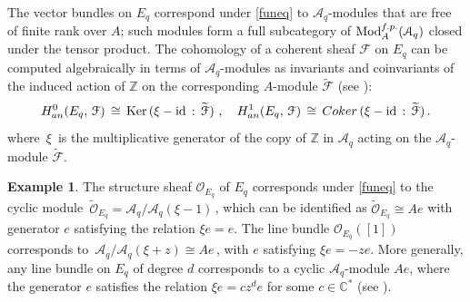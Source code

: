 \documentclass[11pt]{amsart}
\theoremstyle{definition}
\newtheorem{example}[theorem]{Example}
\theoremstyle{remark}
\numberwithin{equation}{section}
\newcommand{\la}{\label}
\newcommand{\Ker}{\mathrm{Ker}}
\newcommand{\id}{\mathrm{id}}
\def\c{\mathbb{C}}
\def\A{\mathcal{A}}
\def\Z{\mathbb{Z}}
\def\O{\mathcal{O}}
\def\Mod{\mathrm{Mod}}
\def \cF{\mathcal{F}}
\begin{document}
The vector bundles on $E_q$ correspond under \eqref{funeq} to $\A_q$-modules that are free of finite rank over $ A$; such modules form a full subcategory of $ \Mod^{\rm f.p.}_{A}(\A_q) $ closed under the tensor product. The cohomology of a coherent sheaf $\cF$ on $E_q$ can be computed algebraically in terms of $\A_q$-modules as invariants and coinvariants of the induced action of $ \Z $ on the corresponding $A$-module $\widetilde{\cF}$ (see \cite[Lemma 2.1]{vdPR07}):
%
\begin{equation}\la{H01}
H^0_{\rm an}(E_q,\,\cF) \,\cong\, \Ker\,(\xi- \id\,:\,\widetilde{\cF})
\ ,\quad  
H^1_{\rm an}(E_q,\,\cF) \,\cong\, {\rm Coker}\,(\xi- \id\,:\,\widetilde{\cF})
\,.
\end{equation}
%
where $\, \xi \,$ is the multiplicative generator of the copy of $\Z $ in $ \A_q$ acting on the $\A_q$-module $\widetilde{\cF}$. 

\begin{example}\la{Ex222}
The structure sheaf $ \O_{E_q}$ of $E_q$ corresponds under \eqref{funeq} to the cyclic module
$\,\widetilde{\O}_{E_q} = \A_q/\A_q(\xi-1)\,$, which can be identified as $ \widetilde{\O}_{E_q} \cong A e $
with generator $e$ satisfying the relation $ \xi e = e $. The line bundle $ \O_{E_{q}}([1])$ corresponds to $\, \A_q/\A_q(\xi+z) \cong A e\,$, with $e$ satisfying $ \xi e = - z e$. 
More generally, any line bundle on $E_q$ of degree $d$
corresponds to a cyclic $\A_q$-module $ A e $, where the generator $e$ satisfies the relation
$ \xi e = c z^d e $ for some $ c\in \c^* $ (see \cite[Example 2.2]{vdPR07}). 
\end{example}
%
\vspace{.5ex}
\end{document}

